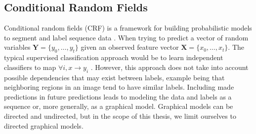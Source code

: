 \subsection{Conditional Random Fields}
\label{sec:crf}

Conditional random fields (CRF) is a framework for building probabilistic 
models to segment and label sequence data \citep{wallach2004conditional}.
When trying to predict a vector of random variables $\mathbf{Y} = \{y_0, \dots, y_t\}$
given an observed feature vector $\mathbf{X} = \{x_0, \dots, x_t\}$. 
The typical supervised classification approach would be 
to learn independent classifiers to map $\forall i,  x \to y_i$
\citep{sutton2012introduction}.
However, this approach does not take into account possible dependencies
that may exist between labels, example being that neighboring 
regions in an image tend to have similar labels. 
Including made predictions in future predictions leads to 
modeling the data and labels as a sequence or, more generally,
as a graphical model.
Graphical models can be directed and undirected, but 
in the scope of this thesis, we limit ourselves to 
directed graphical models. 

